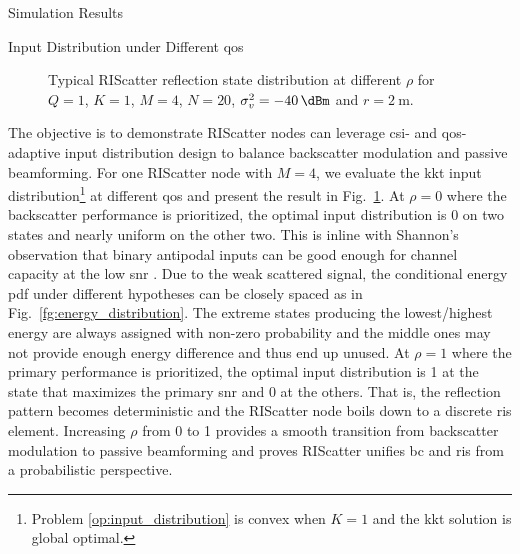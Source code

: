 \documentclass[journal]{IEEEtran}
\begin{document}
\begin{section}{Simulation Results}
	\begin{subsection}{Input Distribution under Different \gls{qos}}
		\begin{figure}[!t]
			\centering
			\resizebox{0.65\columnwidth}{!}{
				
			}
			\caption{Typical RIScatter reflection state distribution at different $\rho$ for $Q=1$, $K=1$, $M=4$, $N=20$, $\sigma_v^2=\SI{-40}{\dBm}$ and $r=\SI{2}{\meter}$.}
			\label{fg:distribution_weights}
		\end{figure}
		The objective is to demonstrate RIScatter nodes can leverage \gls{csi}- and \gls{qos}-adaptive input distribution design to balance backscatter modulation and passive beamforming.
		For one RIScatter node with $M=4$, we evaluate the \gls{kkt} input distribution\footnote{Problem \eqref{op:input_distribution} is convex when $K=1$ and the \gls{kkt} solution is global optimal.} at different \gls{qos} and present the result in Fig.~\ref{fg:distribution_weights}.
		At $\rho=0$ where the backscatter performance is prioritized, the optimal input distribution is \num{0} on two states and nearly uniform on the other two.
		This is inline with Shannon's observation that binary antipodal inputs can be good enough for channel capacity at the low \gls{snr} \cite{Shannon1948}.
		Due to the weak scattered signal, the conditional energy \gls{pdf} under different hypotheses can be closely spaced as in Fig.~\ref{fg:energy_distribution}.
		The extreme states producing the lowest/highest energy are always assigned with non-zero probability and the middle ones may not provide enough energy difference and thus end up unused.
		At $\rho=1$ where the primary performance is prioritized, the optimal input distribution is \num{1} at the state that maximizes the primary \gls{snr} and \num{0} at the others.
		That is, the reflection pattern becomes deterministic and the RIScatter node boils down to a discrete \gls{ris} element.
		Increasing $\rho$ from \num{0} to \num{1} provides a smooth transition from backscatter modulation to passive beamforming and proves RIScatter unifies \gls{bc} and \gls{ris} from a probabilistic perspective.
	\end{subsection}


\end{section}
\end{document}
